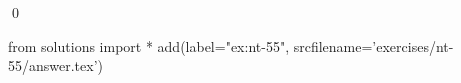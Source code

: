 
\begin{ex} 
  \label{ex:nt-55}
  
  \qed
\end{ex} 
\begin{python0}
from solutions import *
add(label="ex:nt-55",
    srcfilename='exercises/nt-55/answer.tex') 
\end{python0}
